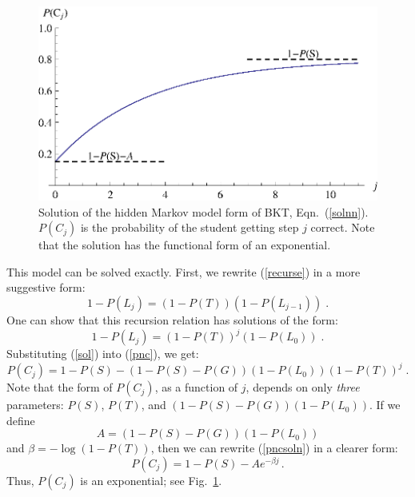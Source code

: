 \documentclass{acmlarge-edm}
\begin{document}
\begin{figure}
\centering\includegraphics{exponential.eps}
\caption{Solution of the hidden Markov model form of BKT, Eqn.~(\ref{solnn}).
          $P(C_j)$ is the probability of  the student getting step $j$
          correct.  Note that the solution has the functional form of
          an exponential.}
\label{bktgraph}
\end{figure}

This model can be  solved exactly.  First, we rewrite (\ref{recurse}) 
in a more suggestive form:
%
\begin{equation}
        1-P(L_j) = \left(1-P(T)\right) \left(1-P(L_{j-1})\right) \; .
\end{equation}
%
One can show that this recursion relation has solutions of the form:
%
\begin{equation}
            1-P(L_j) = \left(1-P(T)\right)^j\left(1-P(L_0)\right) \; .
	    \label{sol}
\end{equation}
%
%
Substituting (\ref{sol}) into (\ref{pnc}), we get:
%
\begin{equation}
        P(C_j) = 1-P(S) -\left(1-P(S)-P(G)\right) \left(1-P(L_0)\right)
                   \left(1-P(T)\right)^j \; . \label{pncsoln}
\end{equation}
%
Note that the form of $P(C_j)$, as a function of $j$, 
depends on only {\em three} parameters:  $P(S)$, $P(T)$, and 
$\left(1-P(S)-P(G)\right) \left(1-P(L_0)\right)$.
If we define
%
\begin{equation} 
          A=\left(1-P(S)-P(G)\right) \left(1-P(L_0)\right)  \label{aa}
\end{equation}
%
 and $\beta=-\log(1-P(T))$, then we can rewrite (\ref{pncsoln}) in 
a clearer form:
%
\begin{equation}
         P(C_j) = 1-P(S) -A e^{-\beta j} \, . \label{solnn}
\end{equation}
%
Thus, $P(C_j)$ is an exponential; see Fig.~\ref{bktgraph}.
\end{document}
